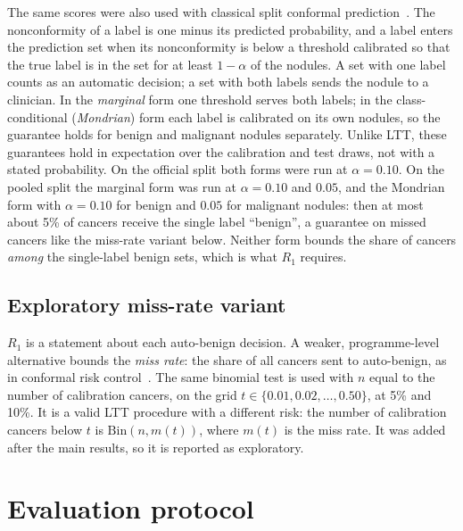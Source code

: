 The same scores were also used with classical split conformal prediction~\citep{vovk2005}. The
nonconformity of a label is one minus its predicted probability, and a label enters the prediction
set when its nonconformity is below a threshold calibrated so that the true label is in the set
for at least $1-\alpha$ of the nodules. A set with one label counts as an automatic decision; a set
with both labels sends the nodule to a clinician. In the \emph{marginal} form one threshold serves
both labels; in the class-conditional (\emph{Mondrian}) form each label is calibrated on its own
nodules, so the guarantee holds for benign and malignant nodules separately. Unlike LTT, these
guarantees hold in expectation over the calibration and test draws, not with a stated
probability. On the official split
both forms were run at $\alpha = 0.10$. On the pooled split the marginal form was run at
$\alpha = 0.10$ and $0.05$, and the Mondrian form with $\alpha = 0.10$ for benign and $0.05$ for
malignant nodules: then at most about 5\% of cancers receive the single label ``benign'', a
guarantee on missed cancers like the miss-rate variant below. Neither form bounds the share of
cancers \emph{among} the single-label benign sets, which is what $R_1$ requires.

\subsection{Exploratory miss-rate variant}
\label{sec:methods-miss}

$R_1$ is a statement about each auto-benign decision. A weaker, programme-level alternative bounds
the \emph{miss rate}: the share of all cancers sent to auto-benign, as in conformal risk
control~\citep{angelopoulos2024crc}. The same binomial test is used with $n$ equal to the number of
calibration cancers, on the grid $t \in \{0.01, 0.02, \dots, 0.50\}$, at 5\% and 10\%. It is a valid
LTT procedure with a different risk: the number of calibration cancers below $t$ is
$\mathrm{Bin}(n, m(t))$, where $m(t)$ is the miss rate. It was added after the main results, so it
is reported as exploratory.

\section{Evaluation protocol}
\label{sec:methods-eval}

